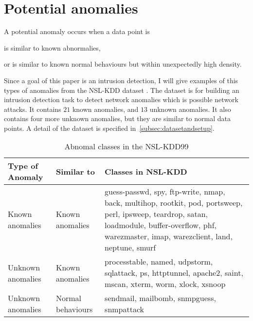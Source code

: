 \section{Potential anomalies}
A potential anomaly occurs when a data point is \begin{inparaenum}
\item is similar to known abnormalies, %
\item or is similar to known normal behaviours but within unexpectedly high density.
\end{inparaenum} 

Since a goal of this paper is an intrusion detection, I will give examples of this types of anomalies from the NSL-KDD dataset \cite{tavallaee09}. 
The dataset is for building an intrusion detection task to detect network anomalies which is possible network attacks. 
It contains $21$ known anomalies, and $13$ unknown anomalies. 
It also contains four more unknown anomalies, but they are similar to normal data points.
A detail of the dataset is specified in~\ref{subsec:datasetandsetup}. 

\begin{table}[h]
\begin{center}
\begin{tabular}{| l | l | p{5cm} |}
\hline
Type of Anomaly & Similar to & Classes in NSL-KDD \\
\hline
Known anomalies & Known anomalies & guess-passwd, spy, ftp-write, nmap, back, multihop, rootkit, pod, portsweep, perl, ipsweep, teardrop, satan, loadmodule, buffer-overflow, phf, warezmaster, imap, warezclient, land, neptune, smurf \\ %
\hline
Unknown anomalies & Known anomalies & processtable, named, udpstorm, sqlattack, ps, httptunnel, apache2, saint, mscan, xterm, worm, xlock, xsnoop \\ %
\hline
Unknown anomalies & Normal behaviours & sendmail, mailbomb, snmpguess, snmpattack \\ %
\hline
\end{tabular}
\end{center}
\caption{Abnomal classes in the NSL-KDD99}
\label{fig:anomalyclasses}
\end{table}
